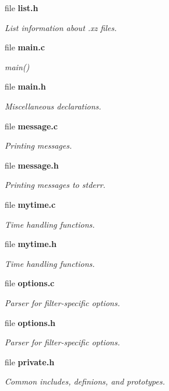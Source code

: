 \begin{DoxyCompactItemize}
file \textbf{ list.\+h}
\begin{DoxyCompactList}\small\item\em List information about .xz files. \end{DoxyCompactList}\item 
file \textbf{ main.\+c}
\begin{DoxyCompactList}\small\item\em main() \end{DoxyCompactList}\item 
file \textbf{ main.\+h}
\begin{DoxyCompactList}\small\item\em Miscellaneous declarations. \end{DoxyCompactList}\item 
file \textbf{ message.\+c}
\begin{DoxyCompactList}\small\item\em Printing messages. \end{DoxyCompactList}\item 
file \textbf{ message.\+h}
\begin{DoxyCompactList}\small\item\em Printing messages to stderr. \end{DoxyCompactList}\item 
file \textbf{ mytime.\+c}
\begin{DoxyCompactList}\small\item\em Time handling functions. \end{DoxyCompactList}\item 
file \textbf{ mytime.\+h}
\begin{DoxyCompactList}\small\item\em Time handling functions. \end{DoxyCompactList}\item 
file \textbf{ options.\+c}
\begin{DoxyCompactList}\small\item\em Parser for filter-\/specific options. \end{DoxyCompactList}\item 
file \textbf{ options.\+h}
\begin{DoxyCompactList}\small\item\em Parser for filter-\/specific options. \end{DoxyCompactList}\item 
file \textbf{ private.\+h}
\begin{DoxyCompactList}\small\item\em Common includes, definions, and prototypes. \end{DoxyCompactList}\item 

\end{DoxyCompactItemize}
